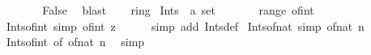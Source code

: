 \begin{isabellebody}
\isanewline
\ \ \ \ \isamarkupfalse%
\ \isamarkupfalse%
\ False\ \isamarkupfalse%
\ blast\isanewline
\ \ \isamarkupfalse%
\isanewline
{}\isamarkupfalse%
%
\endisatagproof
{\isafoldproof}%
%
\isadelimproof
%
\endisadelimproof
%
\isadelimdocument
%
\endisadelimdocument
%
\isatagdocument
%
\isamarkuptrue%
%
\endisatagdocument
{\isafolddocument}%
%
\isadelimdocument
%
\endisadelimdocument
{}\isamarkupfalse%
\ ring{\isacharunderscore}{\kern0pt}{}\isanewline
{}\isanewline
\isanewline
{}\isamarkupfalse%
\ Ints\ {\isacharcolon}{\kern0pt}{\isacharcolon}{\kern0pt}\ {\isachardoublequoteopen}{\isacharprime}{\kern0pt}a\ set{\isachardoublequoteclose}\ \ {\isacharparenleft}{\kern0pt}{\isachardoublequoteopen}{\isasymint}{\isachardoublequoteclose}{\isacharparenright}{\kern0pt}\isanewline
\ \ \ {\isachardoublequoteopen}{\isasymint}\ {\isacharequal}{\kern0pt}\ range\ of{\isacharunderscore}{\kern0pt}int{\isachardoublequoteclose}\isanewline
\isanewline
{}\isamarkupfalse%
\ Ints{\isacharunderscore}{\kern0pt}of{\isacharunderscore}{\kern0pt}int\ {\isacharbrackleft}{\kern0pt}simp{\isacharbrackright}{\kern0pt}{\isacharcolon}{\kern0pt}\ {\isachardoublequoteopen}of{\isacharunderscore}{\kern0pt}int\ z\ {\isasymin}\ {\isasymint}{\isachardoublequoteclose}\isanewline
%
\isadelimproof
\ \ %
\endisadelimproof
%
\isatagproof
{}\isamarkupfalse%
\ {\isacharparenleft}{\kern0pt}simp\ add{\isacharcolon}{\kern0pt}\ Ints{\isacharunderscore}{\kern0pt}def{\isacharparenright}{\kern0pt}%
\endisatagproof
{\isafoldproof}%
%
\isadelimproof
\isanewline
%
\endisadelimproof
\isanewline
{}\isamarkupfalse%
\ Ints{\isacharunderscore}{\kern0pt}of{\isacharunderscore}{\kern0pt}nat\ {\isacharbrackleft}{\kern0pt}simp{\isacharbrackright}{\kern0pt}{\isacharcolon}{\kern0pt}\ {\isachardoublequoteopen}of{\isacharunderscore}{\kern0pt}nat\ n\ {\isasymin}\ {\isasymint}{\isachardoublequoteclose}\isanewline
%
\isadelimproof
\ \ %
\endisadelimproof
%
\isatagproof
{}\isamarkupfalse%
\ Ints{\isacharunderscore}{\kern0pt}of{\isacharunderscore}{\kern0pt}int\ {\isacharbrackleft}{\kern0pt}of\ {\isachardoublequoteopen}of{\isacharunderscore}{\kern0pt}nat\ n{\isachardoublequoteclose}{\isacharbrackright}{\kern0pt}\ \isamarkupfalse%
\ simp%
\endisatagproof
{\isafoldproof}%
%
\isadelimproof
\isanewline
%
\endisadelimproof
\isanewline
{}\isamarkupfalse%

\end{isabellebody}
